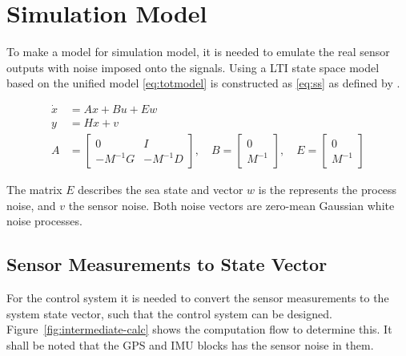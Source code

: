 \chapter{Simulation Model}
\label{ch:simulation-model}

To make a model for simulation model, it is needed to emulate the real
sensor outputs with noise imposed onto the signals. Using a \ac{LTI}
state space model based on the unified model \vref{eq:totmodel} is
constructed as \vref{eq:ss} as defined by \citep[p. 175]{fossen}.

\begin{subequations}
\begin{align}
	\dot x &=  A x + B u + E w \\
	y &= H x + v \\
	A &=
	\begin{bmatrix}
		0 & I\\ -M^{-1}G & -M^{-1}D
	\end{bmatrix}, \quad
	B = 
	\begin{bmatrix}
		0 \\ M^{-1}
	\end{bmatrix}, \quad
	E =
	\begin{bmatrix}
		0 \\ M^{-1}
	\end{bmatrix}
\end{align}
\label{eq:ss}
\end{subequations}

The matrix $E$ describes the sea state and vector $w$ is the
represents the process noise, and $v$ the sensor noise. Both noise
vectors are zero-mean Gaussian white noise processes.


\section{Sensor Measurements to State Vector}
For the control system it is needed to convert the sensor measurements
to the system state vector, such that the control system can be
designed. Figure~\vref{fig:intermediate-calc} shows the computation
flow to determine this. It shall be noted that the \ac{GPS} and
\ac{IMU} blocks has the sensor noise in them.

